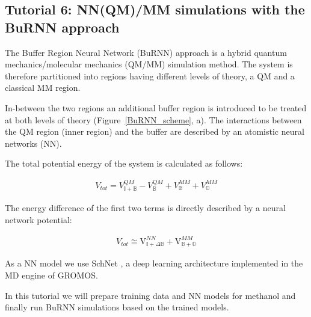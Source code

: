 
\subsection{Tutorial 6: NN(QM)/MM simulations with the BuRNN approach}
The Buffer Region Neural Network (BuRNN) approach \cite{Lier2022BuRNN} is a hybrid quantum mechanics/molecular mechanics (QM/MM) \cite{Warshel1976QM/MM, Senn2009QM/MM} simulation method. The system is therefore partitioned into regions having different levels of theory, a QM and a classical MM region. 

In-between the two regions an additional buffer region is introduced to be treated at both levels of theory (Figure~\ref{BuRNN_scheme}, a). The interactions between the QM region (inner region) and the buffer are described by an atomistic neural networks (NN). 

The total potential energy of the system is calculated as follows:

\begin{equation}
  \begin{aligned}
  V_{tot} = V^{QM}_{\mathbb{I+B}} - V^{QM}_{\mathbb{B}} + V^{MM}_{\mathbb{B}} + V^{MM}_{\mathbb{O}}
    \end{aligned}
\end{equation}

 The energy difference of the first two terms is directly described by a neural network potential: 
 
\begin{equation}
  \begin{aligned}
  V_{tot} \cong \mathrm{V}_{\mathbb{I+}\Delta\mathbb{B}}^{NN} + \mathrm{V}_{\mathbb{B+O}}^{MM}
    \end{aligned}
\end{equation}

 As a NN model we use SchNet \cite{Schuett2017SchNet, Schuett2018SchNet,Schuett2019SPK}, a deep learning architecture implemented in the MD engine of GROMOS.
 
In this tutorial we will prepare training data and NN models for methanol and finally run BuRNN simulations based on the trained models.

